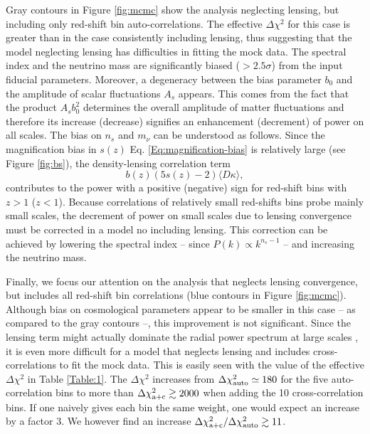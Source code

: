 Gray contours in Figure \ref{fig:mcmc} show the analysis neglecting lensing, but including only red-shift bin auto-correlations. The effective $\Delta \chi^2$ for this case is greater than in the case consistently including lensing, thus suggesting that the model neglecting lensing has difficulties in fitting the mock data. The spectral index and the neutrino mass are significantly biased ($>2.5\sigma$) from the input fiducial parameters. Moreover, a degeneracy between the bias parameter $b_0$ and the amplitude of scalar fluctuations $A_s$ appears. This comes from the fact that the product $A_s b_0^2$ determines the overall amplitude of matter fluctuations and therefore its increase (decrease) signifies an enhancement (decrement) of power on all scales. The bias on $n_s$ and $m_\nu$ can be understood as follows. Since the magnification bias in $s(z)$ Eq. \eqref{Eq:magnification-bias} is relatively large (see Figure \ref{fig:bs}), the density-lensing correlation term
\begin{equation}
b(z)(5s(z)-2)\langle D \kappa \rangle,
\end{equation}   
contributes to the power with a positive (negative) sign for red-shift bins with $z>1$ ($z<1$). Because correlations of relatively small red-shifts bins probe mainly small scales, the decrement of power on small scales due to lensing convergence must be corrected in a model no including lensing. This correction can be achieved by lowering the spectral index -- since $P(k) \propto k^{n_s -1}$ -- and increasing the neutrino mass.

Finally, we focus our attention on the analysis that neglects lensing convergence, but includes all red-shift bin correlations (blue contours in Figure \ref{fig:mcmc}). Although bias on cosmological parameters appear to be smaller in this case -- as compared to the gray contours --, this improvement is not significant. Since the lensing term might actually dominate the radial power spectrum at large scales \cite{Bonvin:2011bg}, it is even more difficult for a model that neglects lensing and includes cross-correlations to fit the mock data. This is easily seen with the value of the effective $\Delta \chi^2$ in Table \ref{Table:1}. The $\Delta \chi^2$ increases from $\Delta \chi_{\rm auto}^2\simeq 180$ for the five auto-correlation bins to more than $\Delta \chi_{\rm a+c}^2\gtrsim2000$ when adding the 10 cross-correlation bins. If one naively gives each bin the same weight,  one would expect an increase by a factor 3. We however find an increase
$\Delta \chi_{\rm a+c}^2/\Delta \chi_{\rm auto}^2\gtrsim 11$.   

